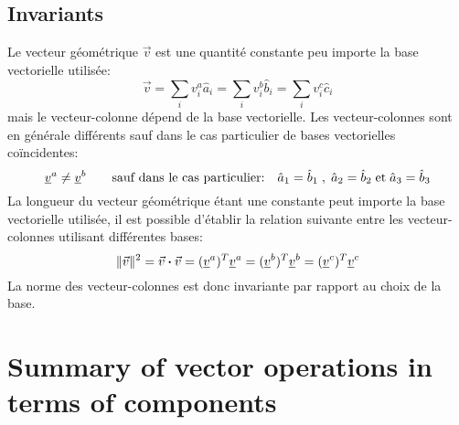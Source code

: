 \subsection{Invariants}
%
Le vecteur géométrique $\vec{v}$ est une quantité constante peu importe la base vectorielle utilisée:
\begin{equation}
 \vec{v} = \sum_{i} v_i^a \hat{a}_i = \sum_{i} v_i^b \hat{b}_i = \sum_{i} v_i^c \hat{c}_i
\end{equation}
mais le vecteur-colonne dépend de la base vectorielle. Les vecteur-colonnes sont en générale différents sauf dans le cas particulier de bases vectorielles coïncidentes:
\begin{equation}
 \underline{v}^{a} \ne \underline{v}^{b} \quad\quad \text{sauf dans le cas particulier:} \quad \hat{a}_1 = \hat{b}_1 \;,\; \hat{a}_2 = \hat{b}_2  \;\text{et}\; \hat{a}_3 = \hat{b}_3
\end{equation}
La longueur du vecteur géométrique étant une constante peut importe la base vectorielle utilisée, il est possible d'établir la relation suivante entre les vecteur-colonnes utilisant différentes bases:
\begin{equation}
 \|\vec{v}\|^2 = \vec{v} \boldsymbol{\cdot} \vec{v} = (\underline{v}^{a})^T \underline{v}^{a} = (\underline{v}^{b})^T \underline{v}^{b} = (\underline{v}^{c})^T \underline{v}^{c}
\end{equation}
La norme des vecteur-colonnes est donc invariante par rapport au choix de la base.






\newpage
\section{Summary of vector operations in terms of components}
\label{sec:vectoropindex}

